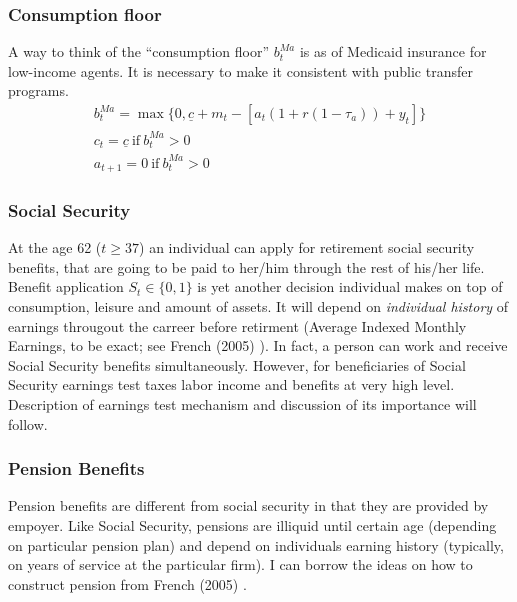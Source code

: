 \documentclass[
10pt, %
a4paper, %
oneside, %
headinclude,footinclude, %
BCOR5mm, %
]{scrartcl}
\begin{document}
\subsubsection{Consumption floor}
A way to think of the ``consumption floor'' $b_t^{Ma}$ is as of Medicaid insurance for low-income agents. It is necessary to make it consistent with public transfer programs.
\begin{eqnarray*}
b_t^{Ma} = \max\{0,\underline{c}+m_t - [a_t(1+r(1-\tau_a)) +y_t]\} \\
c_t = \underline{c} \ \text{if} \ b_t^{Ma} > 0  \\
a_{t+1} = 0 \ \text{if} \ b_t^{Ma} > 0  
\end{eqnarray*}

\subsubsection{Social Security}
At the age 62 ($t\ge37$) an individual can apply for retirement social security benefits, that are going to be paid to her/him through the rest of his/her life. Benefit application $S_t\in\{0,1\}$ is yet another decision individual makes on top of consumption, leisure and amount of assets.
It will depend on \emph{individual history} of earnings througout the carreer before retirment (Average Indexed Monthly Earnings, to be exact; see French (2005) \cite{French2005}). In fact, a person can work and receive Social Security benefits simultaneously. However, for beneficiaries of Social Security earnings test taxes labor income and benefits at very high level. Description of earnings test mechanism and discussion of its importance will follow.
\subsubsection{Pension Benefits}
Pension benefits are different from social security in that they are provided by empoyer. Like Social Security, pensions are illiquid until certain age (depending on particular pension plan) and depend on individuals earning history (typically, on years of service at the particular firm). I can borrow the ideas on how to construct pension from French (2005) \cite{French2005}.
\end{document}
